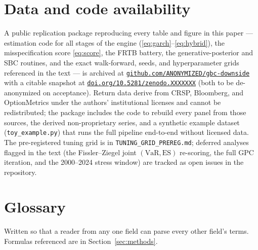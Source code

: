 \documentclass[11pt]{article}
\newcommand{\VaR}{\mathrm{VaR}}
\newcommand{\ES}{\mathrm{ES}}
\theoremstyle{remark}
\begin{document}
\section*{Data and code availability}
A public replication package reproducing every table and figure in this
paper --- estimation code for all stages of the engine
(\eqref{eq:garch}--\eqref{eq:hybrid}), the misspecification score
\eqref{eq:score}, the FRTB battery, the generative-posterior and SBC
routines, and the exact walk-forward, seeds, and hyperparameter grids
referenced in the text --- is archived at
\href{https://github.com/ANONYMIZED/gbc-downside}{\texttt{github.com/ANONYMIZED/gbc-downside}}
with a citable snapshot at
\href{https://doi.org/10.5281/zenodo.XXXXXXX}{\texttt{doi.org/10.5281/zenodo.XXXXXXX}}
(both to be de-anonymized on acceptance). Return data derive from CRSP,
Bloomberg, and OptionMetrics under the authors' institutional licenses
and cannot be redistributed; the package includes the code to rebuild
every panel from those sources, the derived non-proprietary series, and
a synthetic example dataset (\texttt{toy\_example.py}) that runs the full
pipeline end-to-end without licensed data. The pre-registered tuning grid
is in \texttt{TUNING\_GRID\_PREREG.md}; deferred analyses flagged in the
text (the Fissler--Ziegel joint $(\VaR,\ES)$ re-scoring, the full GPC
iteration, and the 2000--2024 stress window) are tracked as open issues
in the repository.




\appendix

\section{Glossary}\label{app:glossary}

Written so that a reader from any one field can parse every other
field's terms. Formulas referenced are in Section~\ref{sec:methods}.
\end{document}
